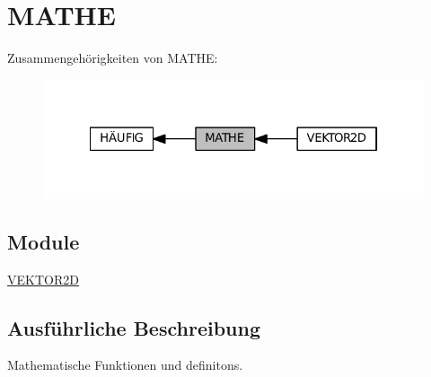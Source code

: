 \hypertarget{group__MATHE}{}\section{M\+A\+T\+HE}
\label{group__MATHE}
Zusammengehörigkeiten von M\+A\+T\+HE\+:\nopagebreak
\begin{figure}[H]
\begin{center}
\leavevmode
\includegraphics[width=322pt]{group__MATHE}
\end{center}
\end{figure}
\subsection*{Module}
\begin{DoxyCompactItemize}
\item 
\hyperlink{group__VEKTOR2D}{V\+E\+K\+T\+O\+R2D}
\end{DoxyCompactItemize}


\subsection{Ausführliche Beschreibung}
Mathematische Funktionen und definitons. 